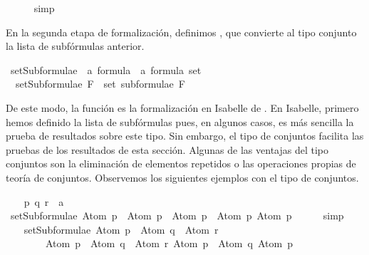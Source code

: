 \begin{isabellebody}
\ \ \ \ \isamarkupfalse%
\ simp%
\endisatagproof
{\isafoldproof}%
%
\isadelimproof
\isanewline
%
\endisadelimproof
{}\isamarkupfalse%
%
\begin{isamarkuptext}%
En la segunda etapa de formalización, definimos 
  , que convierte al tipo conjunto la lista de 
  subfórmulas anterior.%
\end{isamarkuptext}\isamarkuptrue%
\isamarkupfalse%
\ setSubformulae\ {\isacharcolon}{\isacharcolon}\ {\isachardoublequoteopen}{\isacharprime}a\ formula\ {\isasymRightarrow}\ {\isacharprime}a\ formula\ set{\isachardoublequoteclose}\ \isanewline
\ \ {\isachardoublequoteopen}setSubformulae\ F\ {\isasymequiv}\ set\ {\isacharparenleft}subformulae\ F{\isacharparenright}{\isachardoublequoteclose}%
\begin{isamarkuptext}%
De este modo, la función  es la formalización
  en Isabelle de . En Isabelle, primero hemos definido la lista 
  de subfórmulas pues, en algunos casos, es más sencilla la prueba de 
  resultados sobre este tipo. Sin embargo, el tipo de conjuntos facilita
  las pruebas de los resultados de esta sección. Algunas de las
  ventajas del tipo conjuntos son la eliminación de elementos repetidos 
  o las operaciones propias de teoría de conjuntos. Observemos los 
  siguientes ejemplos con el tipo de conjuntos.%
\end{isamarkuptext}\isamarkuptrue%
\isamarkupfalse%
\isanewline
{}\isanewline
%
\isadelimproof
\ \ %
\endisadelimproof
%
\isatagproof
{}\isamarkupfalse%
\ p\ q\ r\ {\isacharcolon}{\isacharcolon}\ {\isacharprime}a\isanewline
\isanewline
\ \ \isamarkupfalse%
\ {\isachardoublequoteopen}setSubformulae\ {\isacharparenleft}Atom\ p\ \isactrlbold {\isasymor}\ Atom\ p{\isacharparenright}\ {\isacharequal}\ {\isacharbraceleft}Atom\ p\ \isactrlbold {\isasymor}\ Atom\ p{\isacharcomma}\ Atom\ p{\isacharbraceright}{\isachardoublequoteclose}\isanewline
\ \ \ \ \isamarkupfalse%
\ simp\isanewline
\ \ \isanewline
\ \ \isamarkupfalse%
\ {\isachardoublequoteopen}setSubformulae\ {\isacharparenleft}{\isacharparenleft}Atom\ p\ \isactrlbold {\isasymrightarrow}\ Atom\ q{\isacharparenright}\ \isactrlbold {\isasymor}\ Atom\ r{\isacharparenright}\ {\isacharequal}\isanewline
\ \ \ \ \ \ \ \ {\isacharbraceleft}{\isacharparenleft}Atom\ p\ \isactrlbold {\isasymrightarrow}\ Atom\ q{\isacharparenright}\ \isactrlbold {\isasymor}\ Atom\ r{\isacharcomma}\ Atom\ p\ \isactrlbold {\isasymrightarrow}\ Atom\ q{\isacharcomma}\ Atom\ p{\isacharcomma}\ \isanewline

\end{isabellebody}
